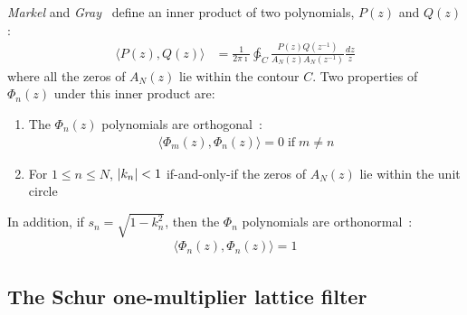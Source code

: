 \documentclass[a4paper,twoside,10pt,english]{article}
\DeclarePairedDelimiter{\mathabs}{\lvert}{\rvert}
\begin{document}
\emph{Markel} and \emph{Gray}~\cite[Equations 13a and 13b]
{MarkelGray_AutocorrelationSpeechAnalysis} define an inner product of two
polynomials, $P\left(z\right)$ and $Q\left(z\right)$:
\begin{align*}
  \langle P\left(z\right),Q\left(z\right)\rangle &= \frac{1}{2\pi \imath}
    \ointctrclockwise_{C}\frac{P\left(z\right)Q\left(z^{-1}\right)}
    {A_{N}\left(z\right)A_{N}\left(z^{-1}\right)}\frac{dz}{z}
\end{align*}
where all the zeros of $A_{N}\left(z\right)$ lie within the contour $C$.
Two properties of $\Phi_{n}\left(z\right)$ under this inner product are:
\begin{enumerate}
\item The $\Phi_{n}\left(z\right)$ polynomials are
  orthogonal~\cite[Appendix D]{Parhi_VLSIDigitalSignalProcessingSystems}:
  \begin{align*}
    \langle \Phi_{m}\left(z\right),\Phi_{n}\left(z\right)\rangle = 0
    \;\text{if}\; m \ne n
  \end{align*}
\item For $1\le n \le N$, $\mathabs{k_{n}} < 1$ if-and-only-if the zeros of
  $A_N\left(z\right)$ lie within the unit
  circle~\cite[pages 72 and 74]{MarkelGray_AutocorrelationSpeechAnalysis}
\end{enumerate}
In addition, if $s_{n}=\sqrt{1-k_{n}^{2}}$\;, then the $\Phi_{n}$ polynomials are
orthonormal~\cite[Appendix D]{Parhi_VLSIDigitalSignalProcessingSystems}:
\begin{align*}
  \langle \Phi_{n}\left(z\right),\Phi_{n}\left(z\right)\rangle = 1
\end{align*}

\subsection{The Schur one-multiplier lattice filter}
\end{document}
